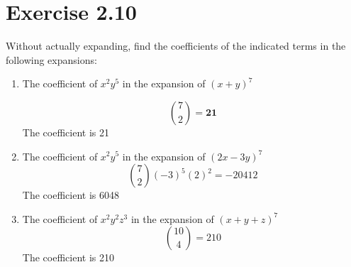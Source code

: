 \documentclass{article}
\begin{document}
	\section*{Exercise 2.10}
	Without actually expanding, find the coefficients of the indicated terms in the following expansions:
	\begin{enumerate}
		\item The coefficient of $x^2y^5$ in the expansion of $(x+y)^7$
		
		\[ \binom{7}{2} = \mathbf{21} \]
		The coefficient is 21
		\item The coefficient of $x^2y^5$ in the expansion of $(2x-3y)^7$
			\[ \binom{7}{2} (-3)^5 (2)^2 = -20412\]
		The coefficient is 6048
		\item The coefficient of $x^2y^2z^3$ in the expansion of $(x+y+z)^7$
			\[ \binom{10}{4} = 210\]		
		The coefficient is 210
	\end{enumerate}
\end{document}
